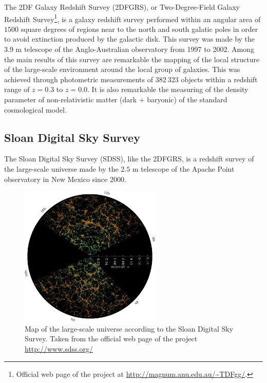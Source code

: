 	
The 2DF Galaxy Redshift Survey (2DFGRS), or Two-Degree-Field Galaxy 
Redshift Survey\footnote{Official web page of the project at 
\url{http://magnum.anu.edu.au/~TDFgg/}.}, is a galaxy redshift survey 
performed within an angular area of $1500$ square degrees of regions near 
to the north and south galatic poles in order to avoid extinction produced 
by the galactic disk. This survey was made by the $3.9$ m telescope of the 
Anglo-Australian observatory from 1997 to 2002. Among the main results of 
this survey are remarkable the mapping of the local structure of the 
large-scale environment around the local group of galaxies. This was 
achieved through photometric measurements of $382\ 323$ objects within a 
redshift range of $z=0.3$ to $z=0.0$. It is also remarkable the measuring 
of the density parameter of non-relativistic matter (dark + baryonic) of
the standard cosmological model.
	

	
	\subsection*{Sloan Digital Sky Survey}
	\label{subsec:SDSS}


The Sloan Digital Sky Survey (SDSS), like the 2DFGRS, is a redshift survey 
of the large-scale universe made by the $2.5$ m telescope of the Apache 
Point observatory in New Mexico since 2000.



\begin{figure}[htbp]
	\centering
	\includegraphics[width=0.6\textwidth]
	{./figures/1_introduction/SDSS.png}
	
	\caption{\small{Map of the large-scale universe according to the Sloan 
	Digital Sky Survey. Taken from the official web page of the project 
	\url{http://www.sdss.org/}}}
	
	\label{fig:SDSS}
\end{figure}



